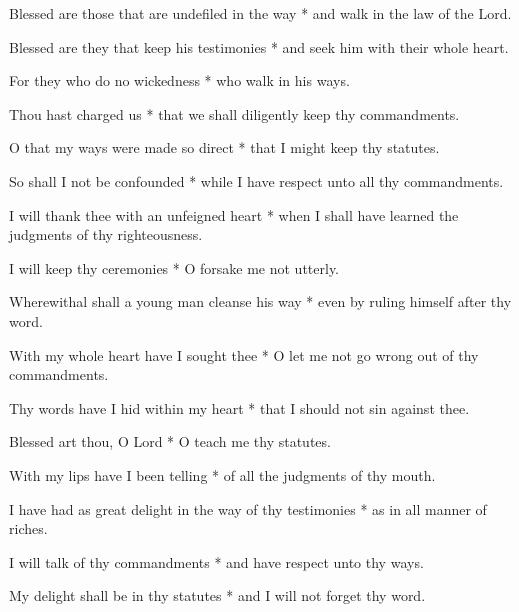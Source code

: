 Blessed are those that are undefiled in the way * and walk in the law of the Lord.

Blessed are they that keep his testimonies * and seek him with their whole heart.

For they who do no wickedness * who walk in his ways.

Thou hast charged us * that we shall diligently keep thy commandments.

O that my ways were made so direct * that I might keep thy statutes.

So shall I not be confounded * while I have respect unto all thy commandments.

I will thank thee with an unfeigned heart * when I shall have learned the judgments of thy righteousness.

I will keep thy ceremonies * O forsake me not utterly.

Wherewithal shall a young man cleanse his way * even by ruling himself after thy word.

With my whole heart have I sought thee * O let me not go wrong out of thy commandments.

Thy words have I hid within my heart * that I should not sin against thee.

Blessed art thou, O Lord * O teach me thy statutes.

With my lips have I been telling * of all the judgments of thy mouth.

I have had as great delight in the way of thy testimonies * as in all manner of riches.

I will talk of thy commandments * and have respect unto thy ways.

My delight shall be in thy statutes * and I will not forget thy word.